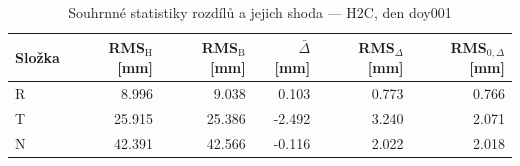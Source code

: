 \begin{table}[H]
\centering
\caption{Souhrnné statistiky rozdílů a jejich shoda — H2C, den doy001}
\label{tab:hermite_vs_bernese_h2c_doy001_summary}
\begin{tabular}{lrrrrr}
\toprule
Složka & RMS$_\mathrm{H}$ [mm] & RMS$_\mathrm{B}$ [mm] & $\bar{\Delta}$ [mm] & RMS$_{\Delta}$ [mm] & RMS$_{0,\Delta}$ [mm] \\
\midrule
R & 8.996 & 9.038 & 0.103 & 0.773 & 0.766 \\
T & 25.915 & 25.386 & -2.492 & 3.240 & 2.071 \\
N & 42.391 & 42.566 & -0.116 & 2.022 & 2.018 \\
\bottomrule
\end{tabular}
\end{table}
